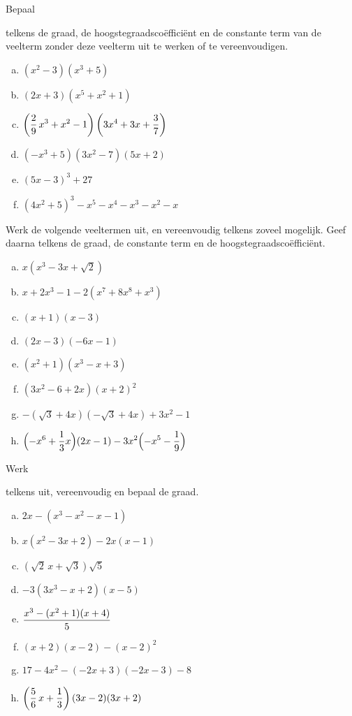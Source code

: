 \documentclass{ximera}
\begin{document}
\begin{Oefening}\setcounter{enumi}{5}
\hypertarget{oef1.5}{Bepaal} telkens de graad, de hoogstegraadsco\"effici\"ent en de constante term van de veelterm zonder deze veelterm uit te werken of te vereenvoudigen. 
\begin{multicols}{2}
\begin{enumerate}[(a)]
\item
$(x^2-3)(x^3+5)$
\item
$(2x+3)(x^5+x^2+1)$
\item
$\displaystyle \left(\frac{2}{9}\,x^3+x^2-1\right)\left(3x^4+3x+\frac{3}{7}\right)$
\item
$(-x^3+5)(3x^2-7)(5x+2)$
\item
$(5x-3)^3+27$
\item
$(4x^2+5)^3-x^5-x^4-x^3-x^2-x$
\end{enumerate}
\end{multicols}
\end{Oefening}

\pagebreak

\begin{Oefening} %
Werk de volgende veeltermen uit, en vereenvoudig telkens zoveel mogelijk. Geef daarna telkens de graad, de constante term en de hoogstegraadsco\"effici\"ent.
\begin{multicols}{2}
\begin{enumerate}[(a)]
\item
$x(x^3-3x+\sqrt{2})$
\item
$x+2x^3-1-2(x^7+8x^8+x^3)$
\item
$(x+1)(x-3)$
\item
$(2x-3)(-6x-1)$
\item
$(x^2+1)(x^3-x+3)$
\item
$(3x^2-6+2x)(x+2)^2$
\item
$-(\sqrt{3}+4x)(-\sqrt{3}+4x)+3x^2-1$
\item
$\displaystyle \Bigl(-x^6 + \frac{1}{3}x\Bigr)(2x-1) - 3x^2\Bigl(-x^5-\frac{1}{9}\Bigr)$
\end{enumerate}
\end{multicols} 
\end{Oefening}

\begin{Oefening}\setcounter{enumi}{7}
\hypertarget{oef1.7}{Werk} telkens uit, vereenvoudig en bepaal de graad. 
\begin{multicols}{2}
\begin{enumerate}[(a)]
\item
$2x-(x^3-x^2-x-1)$
\item
$x(x^2-3x+2)-2x(x-1)$
\item
$\left(\sqrt{2}\,x+\sqrt{3}\right)\sqrt{5}$
\item
$-3(3x^3-x+2)(x-5)$
\item
$\displaystyle \frac{x^3-(x^2+1)(x+4)}{5}$
\item
$(x+2)(x-2)-(x-2)^2$
\item
$17-4x^2-(-2x+3)(-2x-3)-8$
\item
$\displaystyle \left(\frac{5}{6}\,x+\frac{1}{3}\right)(3x-2)(3x+2)$
\end{enumerate}
\end{multicols}
\end{Oefening}
\end{document}
